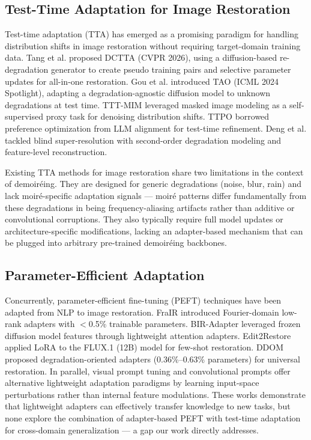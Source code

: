 \documentclass[review,10pt]{elsarticle}
\begin{document}
\subsection{Test-Time Adaptation for Image Restoration}

Test-time adaptation (TTA) has emerged as a promising paradigm for handling distribution shifts in image restoration without requiring target-domain training data. Tang et al. \cite{tang2026degradation} proposed DCTTA (CVPR 2026), using a diffusion-based re-degradation generator to create pseudo training pairs and selective parameter updates for all-in-one restoration. Gou et al. \cite{gou2024testtime} introduced TAO (ICML 2024 Spotlight), adapting a degradation-agnostic diffusion model to unknown degradations at test time. TTT-MIM \cite{mansour2024tttmim} leveraged masked image modeling as a self-supervised proxy task for denoising distribution shifts. TTPO \cite{li2026testtime} borrowed preference optimization from LLM alignment for test-time refinement. Deng et al. \cite{deng2023efficient} tackled blind super-resolution with second-order degradation modeling and feature-level reconstruction.

Existing TTA methods for image restoration share two limitations in the context of demoir\'{e}ing. They are designed for generic degradations (noise, blur, rain) and lack moir\'{e}-specific adaptation signals --- moir\'{e} patterns differ fundamentally from these degradations in being frequency-aliasing artifacts rather than additive or convolutional corruptions. They also typically require full model updates or architecture-specific modifications, lacking an adapter-based mechanism that can be plugged into arbitrary pre-trained demoir\'{e}ing backbones.

\subsection{Parameter-Efficient Adaptation}

Concurrently, parameter-efficient fine-tuning (PEFT) techniques have been adapted from NLP \cite{houlsby2019adapter} to image restoration. FraIR \cite{korkmaz2026frair} introduced Fourier-domain low-rank adapters with $<$0.5\% trainable parameters. BIR-Adapter \cite{eteke2025biradapter} leveraged frozen diffusion model features through lightweight attention adapters. Edit2Restore \cite{yilmaz2026edit2restore} applied LoRA to the FLUX.1 (12B) model for few-shot restoration. DDOM \cite{wu2026ddom} proposed degradation-oriented adapters (0.36\%--0.63\% parameters) for universal restoration. In parallel, visual prompt tuning \cite{jia2022vpt} and convolutional prompts \cite{chen2023convpass} offer alternative lightweight adaptation paradigms by learning input-space perturbations rather than internal feature modulations. These works demonstrate that lightweight adapters can effectively transfer knowledge to new tasks, but none explore the combination of adapter-based PEFT with test-time adaptation for cross-domain generalization --- a gap our work directly addresses.
\end{document}
